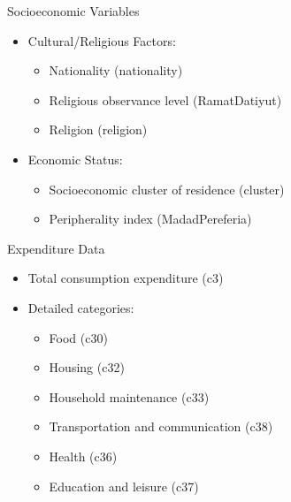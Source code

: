 \documentclass{beamer}
\begin{document}
\begin{frame}{Socioeconomic Variables}
    \begin{itemize}
        \item Cultural/Religious Factors:
              \begin{itemize}
                  \item Nationality (nationality)
                  \item Religious observance level (RamatDatiyut)
                  \item Religion (religion)
              \end{itemize}
        \item Economic Status:
              \begin{itemize}
                  \item Socioeconomic cluster of residence (cluster)
                  \item Peripherality index (MadadPereferia)
              \end{itemize}
    \end{itemize}
\end{frame}

\begin{frame}{Expenditure Data}
    \begin{itemize}
        \item Total consumption expenditure (c3)
        \item Detailed categories:
              \begin{itemize}
                  \item Food (c30)
                  \item Housing (c32)
                  \item Household maintenance (c33)
                  \item Transportation and communication (c38)
                  \item Health (c36)
                  \item Education and leisure (c37)
              \end{itemize}
    \end{itemize}
\end{frame}
\end{document}

